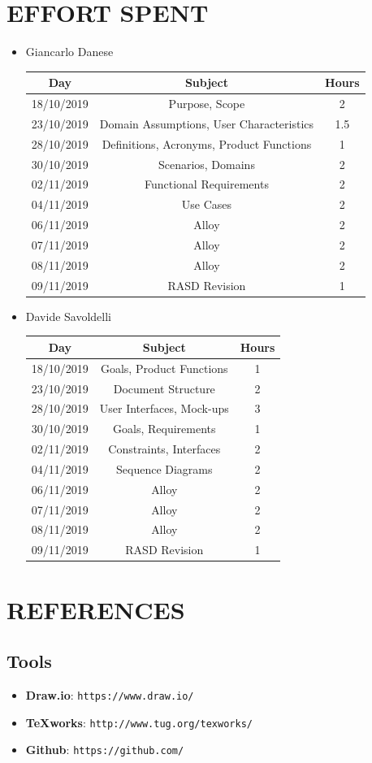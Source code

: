 \documentclass[12pt,a4paper]{article}
\begin{document}
\section{EFFORT SPENT}
\begin{itemize}
		\item Giancarlo Danese
		\begin{center}
			\begin{tabular}{| c | c | c |}
				\hline
				Day & Subject & Hours \\ \hline
				18/10/2019 & Purpose, Scope & 2 \\
				23/10/2019 & Domain Assumptions, User Characteristics & 1.5 \\
				28/10/2019 & Definitions, Acronyms, Product Functions & 1 \\
				30/10/2019 & Scenarios, Domains & 2 \\
				02/11/2019 & Functional Requirements & 2 \\
				04/11/2019 & Use Cases & 2 \\
				06/11/2019 & Alloy & 2 \\
				07/11/2019 & Alloy & 2 \\
				08/11/2019 & Alloy & 2 \\
				09/11/2019 & RASD Revision & 1 \\
				\hline
			\end{tabular}
		\end{center}

		\item Davide Savoldelli
		\begin{center}
			\begin{tabular}{| c | c | c |}
				\hline
				Day & Subject & Hours \\ \hline
				18/10/2019 & Goals, Product Functions & 1 \\
				23/10/2019 & Document Structure & 2 \\
				28/10/2019 & User Interfaces, Mock-ups & 3 \\
				30/10/2019 & Goals, Requirements & 1 \\
				02/11/2019 & Constraints, Interfaces & 2 \\
				04/11/2019 & Sequence Diagrams & 2 \\
				06/11/2019 & Alloy & 2 \\
				07/11/2019 & Alloy & 2 \\
				08/11/2019 & Alloy & 2 \\
				09/11/2019 & RASD Revision & 1 \\
				\hline
			\end{tabular}
		\end{center}
	\end{itemize}
\section{REFERENCES}
\subsection{Tools}
			\begin{itemize}
				\item \textbf{Draw.io}: \texttt{https://www.draw.io/}
				\item \textbf{TeXworks}: \texttt{http://www.tug.org/texworks/}
				\item \textbf{Github}: \texttt{https://github.com/}
			\end{itemize}
\end{document}

